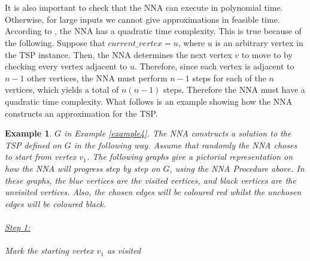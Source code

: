 \documentclass[12pt]{article}
\newtheorem{example}[definition]{Example}
\numberwithin{equation}{subsection}
\numberwithin{table}{subsection}
\begin{document}
\\\\It is also important to check that the NNA can execute in polynomial time. Otherwise, for large inputs we cannot give approximations in feasible time. According to \cite{article}, the NNA has a quadratic time complexity. This is true because of the following. Suppose that $current\_vertex = u$, where $u$ is an arbitrary vertex in the TSP instance. Then, the NNA determines the next vertex $v$ to move to by checking every vertex adjacent to $u$. Therefore, since each vertex is adjacent to $n-1$ other vertices, the NNA must perform $n-1$ steps for each of the $n$ vertices, which yields a total of $n(n-1)$ steps. Therefore the NNA must have a quadratic time complexity. What follows is an example showing how the NNA constructs an approximation for the TSP.
\begin{example}
\label{example_nna_explanation}
 $G$ in Example \ref{example4}. The NNA constructs a solution to the TSP defined on $G$ in the following way. Assume that randomly the NNA choses to start from vertex $v_1$. The following graphs give a pictorial representation on how the NNA will progress step by step on $G$, using the NNA Procedure above. In these graphs, the blue vertices are the visited vertices, and black vertices are the unvisited vertices. Also, the chosen edges will be coloured red whilst the unchosen edges will be coloured black.\\\\
\underline{Step 1:}\\\\
Mark the starting vertex $v_1$ as visited\\\\
\end{example}
\end{document}
